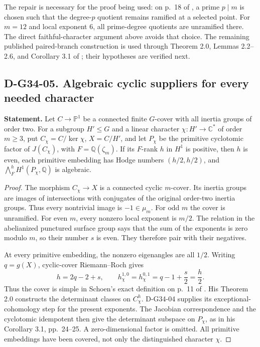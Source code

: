 The repair is necessary for the proof being used: on p.~18 of
\cite{G34:Schoen}, a prime \(p\mid m\) is chosen such that the degree-\(p\)
quotient remains ramified at a selected point.  For \(m=12\) and local
exponent \(6\), all prime-degree quotients are unramified there.  The direct
faithful-character argument above avoids that choice.  The remaining published
paired-branch construction is used through Theorem 2.0, Lemmas 2.2--2.6,
and Corollary 3.1 of \cite{G34:Schoen}; their hypotheses are verified next.

\subsection*{D-G34-05. Algebraic cyclic suppliers for every needed character}

\textbf{Statement.} Let \(C\to\mathbb P^1\) be a connected finite
\(G\)-cover with all inertia groups of order two.  For a subgroup
\(H'\le G\) and a linear character \(\chi:H'\to\mathbb C^*\) of order
\(m\ge3\), put \(C_\chi=C/\ker\chi\), \(X=C/H'\), and let
\(P_\chi\) be the primitive cyclotomic factor of \(J(C_\chi)\), with
\(F=\mathbb Q(\zeta_m)\).  If its \(F\)-rank \(h\) in \(H^1\) is
positive, then \(h\) is even, each primitive embedding has Hodge numbers
\((h/2,h/2)\), and \(\bigwedge_F^hH^1(P_\chi,\mathbb Q)\) is algebraic.

\begin{proof}
The morphism \(C_\chi\to X\) is a connected cyclic \(m\)-cover.  Its
inertia groups are images of intersections with conjugates of the original
order-two inertia groups.  Thus every nontrivial image is \(-1\in\mu_m\).
For odd \(m\) the cover is unramified.  For even \(m\), every nonzero local
exponent is \(m/2\).  The relation in the abelianized punctured surface
group says that the sum of the exponents is zero modulo \(m\), so their
number \(s\) is even.  They therefore pair with their negatives.

At every primitive embedding, the nonzero eigenangles are all \(1/2\).
Writing \(q=g(X)\), cyclic-cover Riemann--Roch gives
\[
                     h=2q-2+s,\qquad
       h^{1,0}_\chi=h^{0,1}_\chi=q-1+\frac{s}{2}=\frac h2.
\]
Thus the cover is simple in Schoen's exact definition on p.~11 of
\cite{G34:Schoen}.  His Theorem 2.0 constructs the determinant classes on
\(C_\chi^h\).  D-G34-04 supplies its exceptional-cohomology step for the
present exponents.  The Jacobian correspondence and the cyclotomic idempotent
then give the determinant subspace on \(P_\chi\), as in his Corollary 3.1,
pp.~24--25.  A zero-dimensional factor is omitted.  All primitive embeddings
have been covered, not only the distinguished character \(\chi\).
\end{proof}

